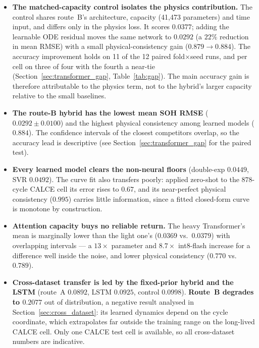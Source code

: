 \begin{itemize}
    \item \textbf{The matched-capacity control isolates the physics
    contribution.} The control shares route~B's architecture, capacity (41,473
    parameters) and time input, and differs only in the physics loss. It scores
    $0.0377$; adding the learnable ODE residual moves the same network to
    $0.0292$ (a $22\%$ reduction in mean RMSE) with a small physical-consistency
    gain ($0.879 \rightarrow 0.884$). The accuracy improvement holds on 11 of
    the 12 paired fold$\times$seed runs, and per cell on three of four with the
    fourth a near-tie (Section~\ref{sec:transformer_gap}, Table~\ref{tab:gap}).
    The main accuracy gain is therefore attributable to the physics term, not
    to the hybrid's larger capacity relative to the small baselines.
    \item \textbf{The route-B hybrid has the lowest mean SOH RMSE} ($0.0292 \pm
    0.0100$) and the highest physical consistency among learned models
    ($0.884$). The confidence intervals of the closest competitors overlap, so
    the accuracy lead is descriptive (see Section~\ref{sec:transformer_gap} for
    the paired test).
    \item \textbf{Every learned model clears the non-neural floors} (double-exp
    $0.0449$, SVR $0.0492$). The curve fit also transfers poorly: applied
    zero-shot to the $878$-cycle CALCE cell its error rises to $0.67$, and its
    near-perfect physical consistency ($0.995$) carries little information,
    since a fitted closed-form curve is monotone by construction.
    \item \textbf{Attention capacity buys no reliable return.} The heavy
    Transformer's mean is marginally lower than the light one's ($0.0369$ vs.\
    $0.0379$) with overlapping intervals --- a $13\times$ parameter and
    $8.7\times$ int8-flash increase for a difference well inside the noise, and
    lower physical consistency ($0.770$ vs.\ $0.789$).
    \item \textbf{Cross-dataset transfer is led by the fixed-prior hybrid and
    the LSTM} (route~A $0.0892$, LSTM $0.0925$, control $0.0998$).
    \textbf{Route~B degrades to $0.2077$} out of distribution, a negative
    result analysed in
    Section~\ref{sec:cross_dataset}: its learned dynamics depend on the cycle
    coordinate, which extrapolates far outside the training range on the
    long-lived CALCE cell. Only one CALCE test cell is available, so all
    cross-dataset numbers are indicative.
\end{itemize}

